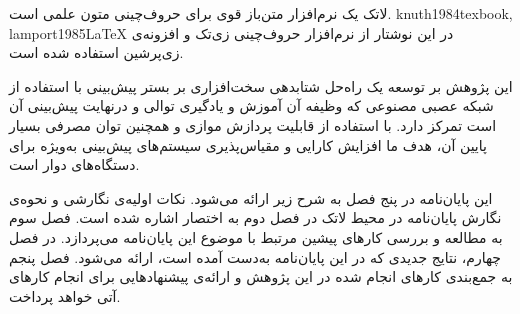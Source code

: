  لاتک یک نرم‌افزار متن‌باز قوی برای حروف‌چینی متون علمی است.
 {knuth1984texbook, lamport1985LaTeX} 
در این نوشتار از نرم‌افزار حروف‌چینی زی‌تک 
 و افزونه‌ی زی‌پرشین
 استفاده شده است.



این پژوهش بر توسعه یک راه‌حل شتابدهی سخت‌افزاری بر بستر  پیش‌بینی   با استفاده از شبکه عصبی مصنوعی که وظیفه آن آموزش و یادگیری توالی و درنهایت پیش‌بینی آن است تمرکز دارد. با استفاده از قابلیت پردازش موازی  و همچنین توان مصرفی بسیار پایین آن، هدف ما افزایش کارایی و مقیاس‌پذیری سیستم‌های پیش‌بینی  به‌ویژه برای دستگاه‌های دوار است.







این پایان‌نامه در پنج فصل به شرح زیر ارائه می‌شود.
نکات اولیه‌ی نگارشی و نحوه‌ی نگارش پایان‌نامه در محیط لاتک در  فصل دوم به اختصار اشاره شده است. 
فصل سوم به مطالعه و بررسی کارهای پیشین مرتبط با موضوع این پایان‌نامه می‌پردازد.
در فصل چهارم، نتایج جدیدی که در این پایان‌نامه به‌دست آمده است، ارائه می‌شود.
فصل پنجم به جمع‌بندی کارهای انجام شده در این پژوهش و ارائه‌ی پیشنهادهایی برای انجام کارهای آتی خواهد پرداخت.